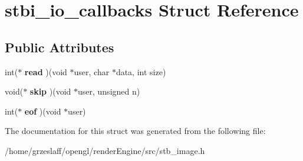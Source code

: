 \hypertarget{structstbi__io__callbacks}{\section{stbi\-\_\-io\-\_\-callbacks Struct Reference}
\label{structstbi__io__callbacks}
}
\subsection*{Public Attributes}
\begin{DoxyCompactItemize}
\item 
\hypertarget{structstbi__io__callbacks_a73818f0a4f467e5abfefb1d635f62d82}{int($\ast$ {\bfseries read} )(void $\ast$user, char $\ast$data, int size)}\label{structstbi__io__callbacks_a73818f0a4f467e5abfefb1d635f62d82}

\item 
\hypertarget{structstbi__io__callbacks_afe8270ea04f0c16cdb63f378469df356}{void($\ast$ {\bfseries skip} )(void $\ast$user, unsigned n)}\label{structstbi__io__callbacks_afe8270ea04f0c16cdb63f378469df356}

\item 
\hypertarget{structstbi__io__callbacks_a2c4f3c3b7c75a2e74a35caf74fb8d177}{int($\ast$ {\bfseries eof} )(void $\ast$user)}\label{structstbi__io__callbacks_a2c4f3c3b7c75a2e74a35caf74fb8d177}

\end{DoxyCompactItemize}


The documentation for this struct was generated from the following file\-:\begin{DoxyCompactItemize}
\item 
/home/grzeslaff/opengl/render\-Engine/src/stb\-\_\-image.\-h\end{DoxyCompactItemize}
